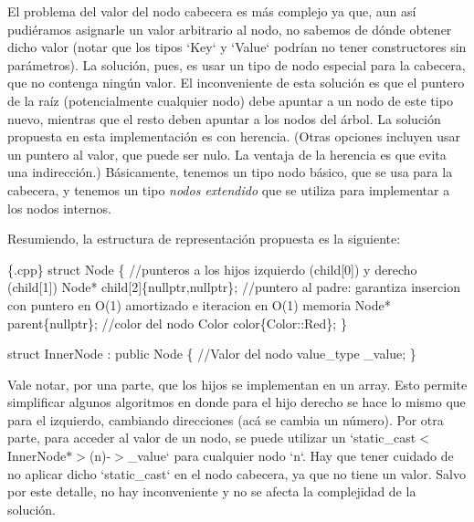 \-El problema del valor del nodo cabecera es más complejo ya que, aun así pudiéramos asignarle un valor arbitrario al nodo, no sabemos de dónde obtener dicho valor (notar que los tipos `\-Key` y `\-Value` podrían no tener constructores sin parámetros). \-La solución, pues, es usar un tipo de nodo especial para la cabecera, que no contenga ningún valor. \-El inconveniente de esta solución es que el puntero de la raíz (potencialmente cualquier nodo) debe apuntar a un nodo de este tipo nuevo, mientras que el resto deben apuntar a los nodos del árbol. \-La solución propuesta en esta implementación es con herencia. (\-Otras opciones incluyen usar un puntero al valor, que puede ser nulo. \-La ventaja de la herencia es que evita una indirección.) \-Básicamente, tenemos un tipo nodo básico, que se usa para la cabecera, y tenemos un tipo {\itshape nodos extendido\/} que se utiliza para implementar a los nodos internos.

\-Resumiendo, la estructura de representación propuesta es la siguiente\-: 
\begin{DoxyCode}
 \{.cpp\}
 \textcolor{keyword}{struct }Node \{
   \textcolor{comment}{//punteros a los hijos izquierdo (child[0]) y derecho (child[1])}
   Node* child[2]\{\textcolor{keyword}{nullptr},\textcolor{keyword}{nullptr}\};
   \textcolor{comment}{//puntero al padre: garantiza insercion con puntero en O(1) amortizado e
       iteracion en O(1) memoria}
   Node* parent\{\textcolor{keyword}{nullptr}\};
   \textcolor{comment}{//color del nodo}
   Color color\{Color::Red\};
 \}

 \textcolor{keyword}{struct }InnerNode : \textcolor{keyword}{public} Node \{
   \textcolor{comment}{//Valor del nodo}
   value\_type \_value;
 \}
\end{DoxyCode}
 \-Vale notar, por una parte, que los hijos se implementan en un array. \-Esto permite simplificar algunos algoritmos en donde para el hijo derecho se hace lo mismo que para el izquierdo, cambiando direcciones (acá se cambia un número). \-Por otra parte, para acceder al valor de un nodo, se puede utilizar un `static\-\_\-cast$<$\-Inner\-Node$\ast$$>$(n)-\/$>$\-\_\-value` para cualquier nodo `n`. \-Hay que tener cuidado de no aplicar dicho `static\-\_\-cast` en el nodo cabecera, ya que no tiene un valor. \-Salvo por este detalle, no hay inconveniente y no se afecta la complejidad de la solución.

